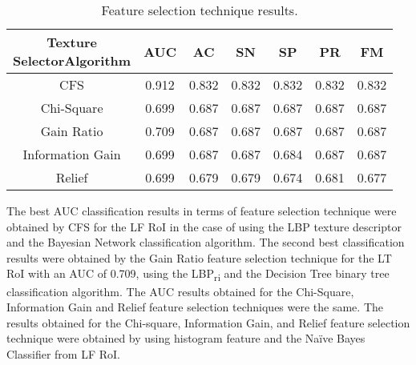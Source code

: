 \documentclass[review]{elsarticle}
\begin{document}
\begin{table}[h!]
	\centering
	\begin{tabular}{|c|c|c|c|c|c|c|}
		\hline 
		\backslashbox{Texture \\ Selector}{Algorithm} &AUC&AC&SN&SP&PR&FM\\
		\hline 
	\cellcolor{blue!25}CFS			& \cellcolor{blue!25} 0.912 & \cellcolor{blue!25}0.832  & \cellcolor{blue!25}0.832 & \cellcolor{blue!25}0.832  & \cellcolor{blue!25}0.832  & \cellcolor{blue!25}0.832 \\ 
		\hline 
		Chi-Square	& 0.699 & 0.687 & 0.687 & 0.687  & 0.687  & 0.687  \\ 
		\hline 
		Gain Ratio		& 0.709  & 0.687  & 0.687  & 0.687  & 0.687  & 0.687  \\ 
		\hline 
		Information Gain 	& 0.699  & 0.687  & 0.687  & 0.684  & 0.687  & 0.687 \\ 
		\hline 
		Relief 		& 0.699  & 0.679  & 0.679  & 0.674 & 0.681  & 0.677  \\ 
		\hline
	\end{tabular} 
	\caption{Feature selection technique results.}
	\label{tab:FeatureResult}
\end{table}

The best AUC classification results in terms of feature selection technique were obtained by CFS for the LF RoI in the case of using the LBP texture descriptor and the Bayesian Network classification algorithm. The second best classification results were obtained by the Gain Ratio feature selection technique for the LT RoI with an AUC of 0.709, using the LBP\textsubscript{ri} and the Decision Tree binary tree classification algorithm. The AUC results obtained for the Chi-Square, Information Gain and Relief feature selection techniques were the same. The results obtained for the Chi-square, Information Gain, and Relief feature selection technique were obtained by using histogram feature and the Na\"ive Bayes Classifier from LF RoI. 

\end{document}
